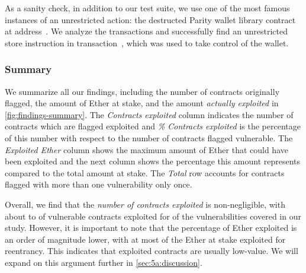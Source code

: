  As a sanity check, in addition to our test suite, we use one of the most famous instances of an unrestricted action: the destructed Parity wallet library contract at address~. We analyze the transactions and successfully find an unrestricted store instruction in transaction~, which was used to take control of the wallet.

\subsubsection{Summary}
We summarize all our findings, including the number of contracts originally flagged, the amount of Ether at stake, and the amount \emph{actually exploited} in \autoref{fig:findings-summary}. The \emph{Contracts exploited} column indicates the number of contracts which are flagged exploited and \emph{\% Contracts exploited} is the percentage of this number with respect to the number of contracts flagged vulnerable. The \emph{Exploited Ether} column shows the maximum amount of Ether that could have been exploited and the next column shows the percentage this amount represents compared to the total amount at stake. The \emph{Total} row accounts for contracts flagged with more than one vulnerability only once.

Overall, we find that the \emph{number of contracts exploited} is non-negligible, with about  to  of vulnerable contracts exploited for  of the \VulnTypesNum vulnerabilities covered in our study.
However, it is important to note that the percentage of Ether exploited is an order of magnitude lower, with at most  of the Ether at stake exploited for reentrancy.
This indicates that exploited contracts are usually low-value.
We will expand on this argument further in \autoref{sec:5a:discussion}.



